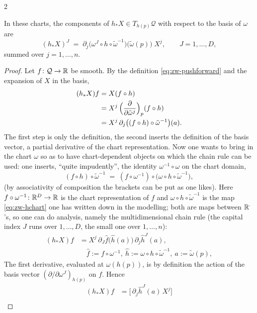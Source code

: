 \begin{paracol}{2}
\begin{theorem}\label{thm:zw-components}
In these charts, the components of $h_*X\in T_{h(p)}\mathcal Q$ with respect to the basis of $\omega$ are
\begin{equation}\label{eq:zw-components}
  (h_*X)^J\;=\;\partial_j\bigl(\omega^J\circ h\circ\tilde\omega^{-1}\bigr)\bigl(\tilde\omega(p)\bigr)\;X^j,\qquad J=1,\dots,D,
\end{equation}
summed over $j=1,\dots,n$.
\end{theorem}
\begin{proof}
Let $f\colon\mathcal Q\to\mathbb{R}$ be smooth. By the definition \eqref{eq:zw-pushforward} and the expansion of $X$ in the basis,
\begin{align*}
  (h_*X)f&=X(f\circ h)\\
  &=X^j\,\Bigl(\frac{\partial}{\partial\tilde\omega^j}\Bigr)_p(f\circ h)\\
  &=X^j\,\partial_j\bigl((f\circ h)\circ\tilde\omega^{-1}\bigr)(a).
\end{align*}
The first step is only the definition, the second inserts the definition of the basis vector, a partial derivative of the chart representation. Now one wants to bring in the chart $\omega$ so as to have chart-dependent objects on which the chain rule can be used: one inserts, ``quite impudently'', the identity $\omega^{-1}\circ\omega$ on the chart domain,
\[
  (f\circ h)\circ\tilde\omega^{-1}\;=\;(f\circ\omega^{-1})\circ\bigl(\omega\circ h\circ\tilde\omega^{-1}\bigr),
\]
(by associativity of composition the brackets can be put as one likes). Here $f\circ\omega^{-1}\colon\mathbb{R}^D\to\mathbb{R}$ is the chart representation of $f$ and $\omega\circ h\circ\tilde\omega^{-1}$ is the map \eqref{eq:zw-hchart} one has written down in the modelling; both are maps between $\mathbb{R}^{\cdot}$'s, so one can do analysis, namely the multidimensional chain rule (the capital index $J$ runs over $1,\dots,D$, the small one over $1,\dots,n$):
\begin{align*}
  (h_*X)f&=X^j\,\partial_J\hat f\bigl(\hat h(a)\bigr)\,\partial_j\hat h^J(a),\\
  &\quad\hat f:=f\circ\omega^{-1},\ \hat h:=\omega\circ h\circ\tilde\omega^{-1},\ a:=\tilde\omega(p),
\end{align*}
The first derivative, evaluated at $\omega(h(p))$, is by definition the action of the basis vector $(\partial/\partial\omega^J)_{h(p)}$ on $f$. Hence
\begin{align*}
  (h_*X)f&=\bigl[\,\partial_j\hat h^J(a)\,X^j\bigr]\\

\end{align*}
\end{proof}
\end{paracol}

